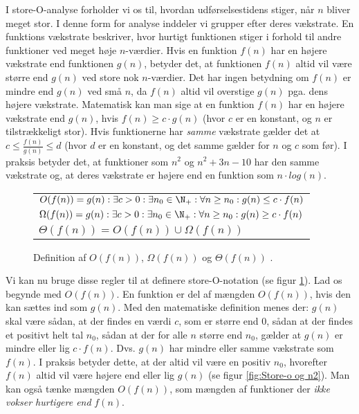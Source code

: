 I store-O-analyse forholder vi os til, hvordan udførselsestidens stiger, når $n$ bliver meget stor. I denne form for analyse inddeler vi grupper efter deres vækstrate. En funktions vækstrate beskriver, hvor hurtigt funktionen stiger i forhold til andre funktioner ved meget høje $n$-værdier. Hvis en funktion $f(n)$ har en højere vækstrate end funktionen $g(n)$, betyder det, at funktionen $f(n)$ altid vil være større end $g(n)$ ved store nok $n$-værdier. Det har ingen betydning om $f(n)$ er mindre end $g(n)$ ved små $n$, da $f(n)$ altid vil overstige $g(n)$ pga. dens højere vækstrate. Matematisk kan man sige at en funktion $f(n)$ har en højere vækstrate end $g(n)$, hvis $f(n) \geq c \cdot g(n)$  (hvor $c$ er en konstant, og $n$ er tilstrækkeligt stor). Hvis funktionerne har \emph{samme} vækstrate gælder det at $c \leq \frac{f(n)}{g(n)} \leq d$ (hvor $d$ er en konstant, og det samme gælder for $n$ og $c$ som før). I praksis betyder det, at funktioner som $n^2$ og $n^2+3n-10$ har den samme vækstrate og, at deres vækstrate er højere end en funktion som $n \cdot log(n)$.\\

\begin{figure}[h]
	\begin{center}
		\padtable
		\begin{tabular}{l}
			\hline
			$O(f(n)) = {g(n): \exists c > 0: \exists n_0 \in \N_+: \forall n \geq n_0: g(n) \leq c \cdot f(n)}$\\
			$\Omega (f(n)) = {g(n): \exists c > 0: \exists n_0 \in \N_+: \forall n \geq n_0: g(n) \geq c \cdot f(n)}$\\
			$\Theta (f(n)) = O(f(n)) \cup \Omega (f(n))$\\
			\hline
		\end{tabular}
	\end{center}
	\caption{Definition af $O(f(n))$, $\Omega (f(n))$ og $\Theta (f(n))$ \cite[s. 26]{aogd}.}
	\label{fig:Store-O definition}
\end{figure}

Vi kan nu bruge disse regler til at definere store-O-notation (se figur \ref{fig:Store-O definition}). Lad os begynde med $O(f(n))$. En funktion er del af mængden $O(f(n))$, hvis den kan sættes ind som $g(n)$. Med den matematiske definition menes der: $g(n)$ skal være sådan, at der findes en værdi $c$, som er større end $0$, sådan at der findes et positivt helt tal $n_0$, sådan at der for alle $n$ større end $n_0$, gælder at $g(n)$ er mindre eller lig $c \cdot f(n)$. Dvs. $g(n)$ har mindre eller samme vækstrate som $f(n)$. I praksis betyder dette, at der altid vil være en positiv $n_0$, hvorefter $f(n)$ altid vil være højere end eller lig $g(n)$ (se figur \ref{fig:Store-o og n2}). Man kan også tænke mængden $O(f(n))$, som mængden af funktioner der \emph{ikke vokser hurtigere end} $f(n)$.\\


